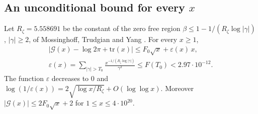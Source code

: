 \subsection{An unconditional bound for every $x$}

\begin{theorem}\label{mq:thm:uncond}
Let $R_\zeta=5.558691$ be the constant of the zero free region $\beta\le1-1/(R_\zeta\log|\gamma|)$, $|\gamma|\ge2$, of Mossinghoff, Trudgian and Yang \cite{MTY}. For every $x\ge1$,
\begin{gather*}
\bigl|\mathcal G(x)-\log2\pi+\mathrm{tr}(x)\bigr|\le F_0\sqrt x+\varepsilon(x)\,x,\\ \varepsilon(x)=\sum_{|\gamma|>T_0}\frac{x^{-1/(R_\zeta\log|\gamma|)}}{\gamma^2}\le F(T_0)<2.97\cdot10^{-12}.
\end{gather*}
The function $\varepsilon$ decreases to $0$ and $\log(1/\varepsilon(x))=2\sqrt{\log x/R_\zeta}+O(\log\log x)$. Moreover $|\mathcal G(x)|\le2F_0\sqrt x+2$ for $1\le x\le4\cdot10^{20}$.
\end{theorem}

